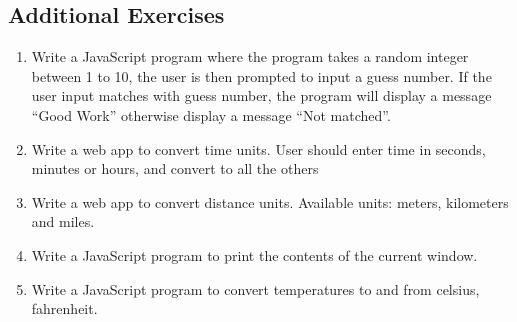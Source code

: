\documentclass[11pt,a4paper]{article}
\begin{document}
\subsection*{Additional Exercises}
\begin{enumerate}
\item Write a JavaScript program where the program takes a random integer between 1 to 10, the user is then prompted to input a guess number. If the user input matches with guess number, the program will display a message ``Good Work'' otherwise display a message ``Not matched''. 
\item Write a web app to convert time units. User should enter time in seconds, minutes or hours, and convert to all the others
\item Write a web app to convert distance units. Available units: meters, kilometers and miles. 
\item Write a JavaScript program to print the contents of the current window.
\item Write a JavaScript program to convert temperatures to and from celsius, fahrenheit.
\end{enumerate}
\end{document}
